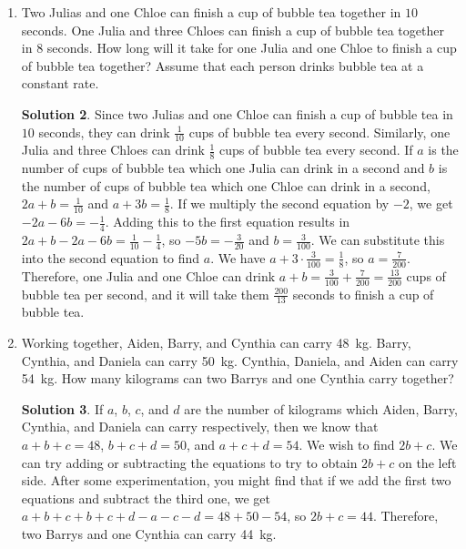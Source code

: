 \documentclass{article}
\theoremstyle{definition}
\newtheorem*{solution}{Solution}
\begin{document}
\begin{enumerate}
\begin{solution}
            To solve this using a system of equations, let $a$ be the number of
            correctly answered questions and let $b$ be the number of
            incorrectly answered questions. $a + b = 50$ and $5a - b = 184$. If
            we add the two equations, we get $a + b + 5a - b = 50 + 184$, so $6a
            = 234$ and $a = 39$.
        \end{solution}
        \item Two Julias and one Chloe can finish a cup of bubble tea together
        in $10$ seconds. One Julia and three Chloes can finish a cup of bubble
        tea together in $8$ seconds. How long will it take for one Julia and one
        Chloe to finish a cup of bubble tea together? Assume that each person
        drinks bubble tea at a constant rate.
        \begin{solution}
            Since two Julias and one Chloe can finish a cup of bubble tea in
            $10$ seconds, they can drink $\frac{1}{10}$ cups of bubble tea every
            second. Similarly, one Julia and three Chloes can drink
            $\frac{1}{8}$ cups of bubble tea every second. If $a$ is the number
            of cups of bubble tea which one Julia can drink in a second and $b$
            is the number of cups of bubble tea which one Chloe can drink in a
            second, $2a + b = \frac{1}{10}$ and $a + 3b = \frac{1}{8}$. If we
            multiply the second equation by $-2$, we get $-2a - 6b =
            -\frac{1}{4}$. Adding this to the first equation results in $2a + b
            - 2a - 6b = \frac{1}{10} - \frac{1}{4}$, so $-5b = -\frac{3}{20}$
            and $b = \frac{3}{100}$. We can substitute this into the second
            equation to find $a$. We have $a + 3 \cdot \frac{3}{100} =
            \frac{1}{8}$, so $a = \frac{7}{200}$. Therefore, one Julia and one
            Chloe can drink $a + b = \frac{3}{100} + \frac{7}{200} =
            \frac{13}{200}$ cups of bubble tea per second, and it will take them
            $\frac{200}{13}$ seconds to finish a cup of bubble tea.
        \end{solution}
        \item Working together, Aiden, Barry, and Cynthia can carry
        \SI{48}{\kilogram}. Barry, Cynthia, and Daniela can carry
        \SI{50}{\kilogram}. Cynthia, Daniela, and Aiden can carry
        \SI{54}{\kilogram}. How many kilograms can two Barrys and one Cynthia
        carry together?
        \begin{solution}
            If $a$, $b$, $c$, and $d$ are the number of kilograms which Aiden,
            Barry, Cynthia, and Daniela can carry respectively, then we know
            that $a + b + c = 48$, $b + c + d = 50$, and $a + c + d = 54$. We
            wish to find $2b + c$. We can try adding or subtracting the
            equations to try to obtain $2b + c$ on the left side. After some
            experimentation, you might find that if we add the first two
            equations and subtract the third one, we get $a + b + c + b + c + d
            - a - c - d = 48 + 50 - 54$, so $2b + c = 44$. Therefore, two Barrys
            and one Cynthia can carry \SI{44}{\kilogram}.


\end{solution}
\end{enumerate}
\end{document}
